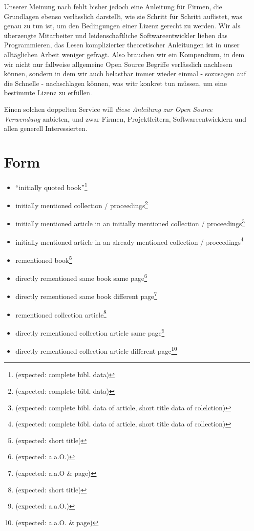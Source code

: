 \documentclass[DIV=calc,BCOR=5mm,11pt,headings=small,oneside,toc=bib]{scrbook}
\begin{document}
Unserer Meinung nach fehlt bisher jedoch eine Anleitung für Firmen, die
Grundlagen ebenso verlässlich darstellt, wie sie Schritt für Schritt auflistet,
was genau zu tun ist, um den Bedingungen einer Lizenz gerecht zu werden. Wir als
überzeugte Mitarbeiter und leidenschaftliche Softwareentwickler lieben das
Programmieren, das Lesen komplizierter theoretischer Anleitungen ist in unser
alltäglichen Arbeit weniger gefragt. Also brauchen wir ein Kompendium, in dem
wir nicht nur fallweise allgemeine Open Source Begriffe verlässlich nachlesen
können, sondern in dem wir auch belastbar immer wieder einmal - sozusagen auf
die Schnelle - nachschlagen können, was witr konkret tun müssen, um eine
bestimmte Lizenz zu erfüllen.

Einen solchen doppelten Service will \emph{diese Anleitung zur Open Source
Verwendung} anbieten, und zwar Firmen, Projektleitern, Softwareentwicklern und
allen generell Interessierten.

\section{Form}
\begin{itemize}
  \item ``initially quoted book''\footnote{\cite[vgl.][123ff]{Grassmuck2002a}
  (expected: complete bibl. data)}
  \item initially mentioned collection /
  proceedings\footnote{\cite[vgl.][123ff]{DjoGehGraKreSpi2008a} (expected: complete
  bibl. data)}
  \item initially mentioned article in an initially mentioned collection /
  proceedings\footnote{\cite[vgl.][123ff]{Spielkamp2008a} (expected: complete
  bibl. data of article, short title data of colelction)}
  \item initially mentioned article in an already mentioned collection
  / proceedings\footnote{\cite[vglveröffentlichen.][123ff]{Kreutzer2008a}
  (expected: complete bibl. data of article, short title data of collection)}
  \item rementioned book\footnote{\cite[vgl.][120]{Fogel2006a} (expected: short
  title)}
  \item directly rementioned same book same
  page\footnote{\cite[vgl.][120]{Fogel2006a} (expected: a.a.O.)}
  \item directly rementioned same book different
  page\footnote{\cite[vgl.][121]{Fogel2006a} (expected: a.a.O \& page)}
  \item rementioned collection article\footnote{\cite[vgl.][120 ]{Kreutzer2008a} (expected: short
  title)}
  \item directly rementioned collection article same
  page\footnote{\cite[vgl.][120]{Kreutzer2008a}(expected: a.a.O.)}
  \item directly rementioned collection article different
  page\footnote{\cite[vgl.][121]{Kreutzer2008a}(expected: a.a.O. \& page)}
\end{itemize}
\end{document}

